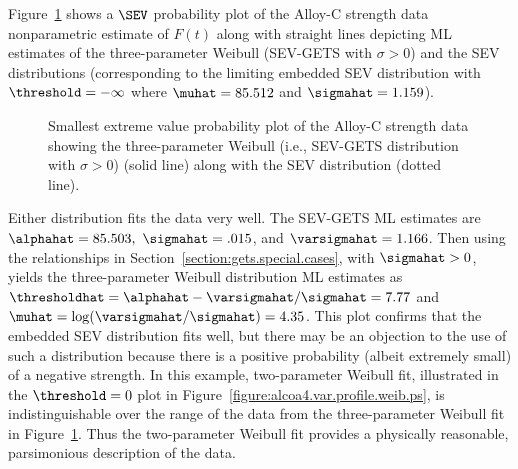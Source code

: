 \begin{example}
Figure~\ref{figure:alcoa4.getssev.gmleprobplot.ps} shows a $\SEV$
probability plot of the Alloy-C strength data nonparametric estimate
of $F(t)$ along with straight lines depicting ML estimates of the
three-parameter Weibull (SEV-GETS with $\sigma>0$) and the SEV
distributions (corresponding to the limiting embedded SEV
distribution with $\threshold=-\infty$ where $\muhat=85.512$ and
$\sigmahat=1.159$).
\begin{figure}
\caption{Smallest extreme value probability plot of the 
Alloy-C strength data showing the three-parameter Weibull (i.e., SEV-GETS
distribution with $\sigma>0$) (solid line)
along with the SEV distribution (dotted line).}
\label{figure:alcoa4.getssev.gmleprobplot.ps}
\end{figure}
Either distribution fits the data very well.  The SEV-GETS ML
estimates are $\alphahat=85.503,$ $\sigmahat=.015$, and $\varsigmahat=1.166$.
Then using the relationships in
Section~\ref{section:gets.special.cases}, with $\sigmahat >0$, yields the
three-parameter Weibull distribution ML estimates as
$\thresholdhat=\alphahat-\varsigmahat/\sigmahat=7.77$ and
$\muhat=\log(\varsigmahat/\sigmahat)=4.35$.
This plot confirms that the embedded SEV distribution fits well, but
there may be an objection to the use of such a distribution because
there is a positive probability (albeit extremely small) of a negative
strength. In this example, two-parameter Weibull fit, illustrated in
the $\threshold=0$ plot in
Figure~\ref{figure:alcoa4.var.profile.weib.ps}, is indistinguishable
over the range of the data from the three-parameter Weibull fit in
Figure~\ref{figure:alcoa4.getssev.gmleprobplot.ps}.  Thus the
two-parameter Weibull fit provides a physically reasonable,
parsimonious description of the data.
\end{example}


